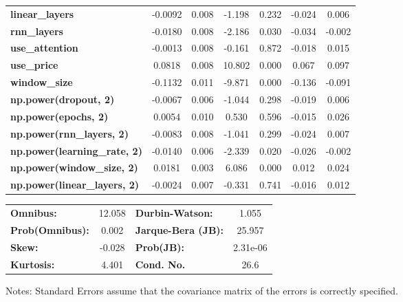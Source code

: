 \begin{center}
\begin{tabular}{lcccccc}
\textbf{linear\_layers}              &      -0.0092  &        0.008     &    -1.198  &         0.232        &       -0.024    &        0.006     \\
\textbf{rnn\_layers}                 &      -0.0180  &        0.008     &    -2.186  &         0.030        &       -0.034    &       -0.002     \\
\textbf{use\_attention}              &      -0.0013  &        0.008     &    -0.161  &         0.872        &       -0.018    &        0.015     \\
\textbf{use\_price}                  &       0.0818  &        0.008     &    10.802  &         0.000        &        0.067    &        0.097     \\
\textbf{window\_size}                &      -0.1132  &        0.011     &    -9.871  &         0.000        &       -0.136    &       -0.091     \\
\textbf{np.power(dropout, 2)}        &      -0.0067  &        0.006     &    -1.044  &         0.298        &       -0.019    &        0.006     \\
\textbf{np.power(epochs, 2)}         &       0.0054  &        0.010     &     0.530  &         0.596        &       -0.015    &        0.026     \\
\textbf{np.power(rnn\_layers, 2)}    &      -0.0083  &        0.008     &    -1.041  &         0.299        &       -0.024    &        0.007     \\
\textbf{np.power(learning\_rate, 2)} &      -0.0140  &        0.006     &    -2.339  &         0.020        &       -0.026    &       -0.002     \\
\textbf{np.power(window\_size, 2)}   &       0.0181  &        0.003     &     6.086  &         0.000        &        0.012    &        0.024     \\
\textbf{np.power(linear\_layers, 2)} &      -0.0024  &        0.007     &    -0.331  &         0.741        &       -0.016    &        0.012     \\
\bottomrule
\end{tabular}
\begin{tabular}{lclc}
\textbf{Omnibus:}       & 12.058 & \textbf{  Durbin-Watson:     } &    1.055  \\
\textbf{Prob(Omnibus):} &  0.002 & \textbf{  Jarque-Bera (JB):  } &   25.957  \\
\textbf{Skew:}          & -0.028 & \textbf{  Prob(JB):          } & 2.31e-06  \\
\textbf{Kurtosis:}      &  4.401 & \textbf{  Cond. No.          } &     26.6  \\
\bottomrule
\end{tabular}
\end{center}

Notes: \newline
 [1] Standard Errors assume that the covariance matrix of the errors is correctly specified.